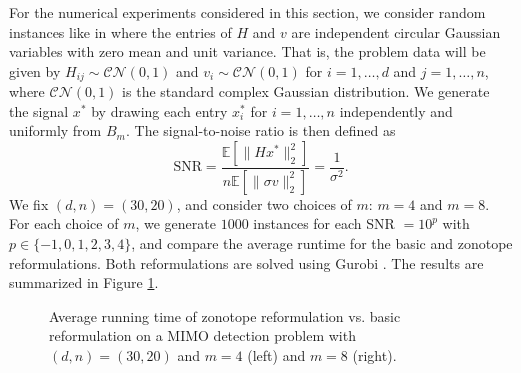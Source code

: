 \documentclass{article}
\theoremstyle{definition}
\begin{document}
For the numerical experiments considered in this section, we consider random instances like in \cite{jiang2021tightness} where the entries of $H$ and $v$ are independent circular Gaussian variables with zero mean and unit variance. That is, the problem data will be given by $H_{ij} \sim \mathcal{CN}(0,1)$ and $v_i \sim \mathcal{CN}(0,1)$ for $i =1,\dots,d$ and $j=1,\dots,n$, where $\mathcal{CN}(0,1)$ is the standard complex Gaussian distribution. We generate the signal $x^*$ by drawing each entry $x_i^*$ for $i=1,\dots,n$ independently and uniformly from $B_m$. The signal-to-noise ratio is then defined as~\cite[Section 5]{jiang2021tightness}
\begin{equation}
    \text{SNR} = \frac{\mathbb{E}[\|H x^*\|_2^2]}{n\mathbb{E}[\|\sigma v\|_2^2]} = \frac{1}{\sigma^2}.
\end{equation}
We fix $(d,n) = (30,20)$, and consider two choices of $m$: $m =4$ and $m=8$. For each choice of $m$, we generate $1000$ instances for each SNR $=10^p$ with $p \in \{-1,0,1,2,3,4\}$, and compare the average runtime for the basic and zonotope reformulations. Both reformulations are solved using Gurobi \cite{gurobi}. The results are summarized in Figure \ref{fig:MIMO-runtime}.

\begin{figure}[ht]
\centering
{}
\caption{Average running time of zonotope reformulation vs. basic reformulation on a MIMO detection problem with $(d,n) = (30,20)$ and $m=4$ (left) and $m=8$ (right).}
\label{fig:MIMO-runtime}
\end{figure}
\end{document}
